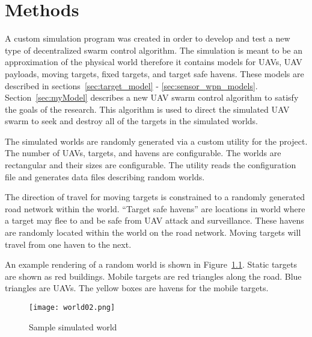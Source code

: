 \chapter{Methods}
\label{chap:worldScenModel}

A custom simulation program was created in order to develop and test a new type of decentralized swarm control algorithm. The simulation is meant to be an approximation of the physical world therefore it contains models for UAVs, UAV payloads, moving targets, fixed targets, and target safe havens.  These models are described in sections~\ref{sec:target_model} - \ref{sec:sensor_wpn_models}.  Section~\ref{sec:myModel} describes a new UAV swarm control algorithm to satisfy the goals of the research.  This algorithm is used to direct the simulated UAV swarm to seek and destroy all of the targets in the simulated worlds.

The simulated worlds are randomly generated via a custom utility for the project.  The number of UAVs, targets, and havens are configurable.  The worlds are rectangular and their sizes are configurable.  The utility reads the configuration file and generates data files describing random worlds.  


The direction of travel for moving targets is constrained to a randomly generated road network within the world.  ``Target safe havens'' are locations in world where a target may flee to and be safe from UAV attack and surveillance.  These havens are randomly located within the world on the road network.  Moving targets will travel from one haven to the next.

An example rendering of a random world is shown in Figure~\ref{fig:sample_world}. Static targets are shown as red buildings.  Mobile targets are red triangles along the road.  Blue triangles are UAVs.  The yellow boxes are havens for the mobile targets.




\begin{figure}[H]
	\centering
	\texttt{[image: world02.png]}
	\caption{Sample simulated world}
	\label{fig:sample_world}
\end{figure}



